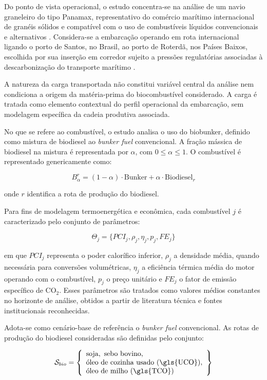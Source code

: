 Do ponto de vista operacional, o estudo concentra-se na análise de um navio graneleiro do tipo Panamax, representativo do comércio marítimo internacional de granéis sólidos e compatível com o uso de combustíveis líquidos convencionais e alternativos \citep{unctad_rmt_2024}. Considera-se a embarcação operando em rota internacional ligando o porto de Santos, no Brasil, ao porto de Roterdã, nos Países Baixos, escolhida por sua inserção em corredor sujeito a pressões regulatórias associadas à descarbonização do transporte marítimo \citep{eu_reg_2023_957,eu_reg_2023_1805}.

A natureza da carga transportada não constitui variável central da análise nem condiciona a origem da matéria-prima do biocombustível considerado. A carga é tratada como elemento contextual do perfil operacional da embarcação, sem modelagem específica da cadeia produtiva associada.

No que se refere ao combustível, o estudo analisa o uso do biobunker, definido como mistura de biodiesel ao \emph{bunker fuel} convencional. A fração mássica de biodiesel na mistura é representada por $\alpha$, com $0 \leq \alpha \leq 1$. O combustível é representado genericamente como:

\[
B_{\alpha}^{r} = (1-\alpha)\cdot \text{Bunker} + \alpha \cdot \text{Biodiesel}_r
\]

onde $r$ identifica a rota de produção do biodiesel.

Para fins de modelagem termoenergética e econômica, cada combustível $j$ é caracterizado pelo conjunto de parâmetros:

\[
\Theta_j = \{PCI_j, \rho_j, \eta_j, p_j, FE_j\}
\]

em que $PCI_j$ representa o poder calorífico inferior, $\rho_j$ a densidade média, quando necessária para conversões volumétricas, $\eta_j$ a eficiência térmica média do motor operando com o combustível, $p_j$ o preço unitário e $FE_j$ o fator de emissão específico de CO$_2$. Esses parâmetros são tratados como valores médios constantes no horizonte de análise, obtidos a partir de literatura técnica e fontes institucionais reconhecidas.

Adota-se como cenário-base de referência o \emph{bunker fuel} convencional. As rotas de produção do biodiesel consideradas são definidas pelo conjunto:

\[
\mathcal{S}_{bio} =
\left\{
\begin{array}{l}
\text{soja},\ \text{sebo bovino},\\
\text{óleo de cozinha usado (\gls{UCO})},\\
\text{óleo de milho (\gls{TCO})}
\end{array}
\right\}
\]

